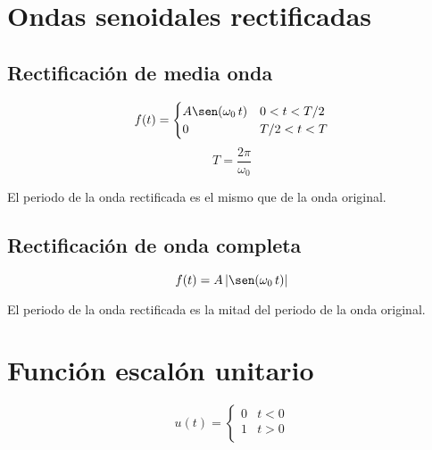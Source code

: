 \section{Ondas senoidales rectificadas}
\subsection{Rectificación de media onda}
\begin{equation*}
    f(t)=\begin{cases}
        A\sen(\omega_0\,t)&0<t<T/2\\
        0&T/2<t<T\\
    \end{cases}
\end{equation*}
\begin{equation*}
    T=\frac{2\pi}{\omega_0}
\end{equation*}
\begin{figure}[H]
    \centering
    
\end{figure}

El periodo de la onda rectificada es el mismo que de la onda original.

\subsection{Rectificación de onda completa}
\begin{equation*}
    f(t)=A\,|\sen(\omega_0\,t)|
\end{equation*}
\begin{figure}[H]
    \centering
    
\end{figure}

El periodo de la onda rectificada es la mitad del periodo de la onda original.

\section{Función escalón unitario}
\begin{equation}
    u(t)=\begin{cases}
        0&t<0\\
        1&t>0\\
    \end{cases}
\end{equation}
\begin{figure}[H]
    \centering
    
\end{figure}

